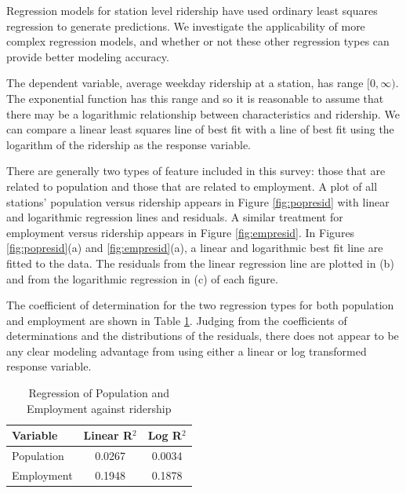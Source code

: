 \documentclass[11pt]{report}
\begin{document}
Regression models for station level ridership have used ordinary least squares regression \cite{Kuby2004, Taylor2008, Currie2011, Durning2015, Gutierrez2011} to generate predictions. We investigate the applicability of more complex regression models, and whether or not these other regression types can provide better modeling accuracy.

The dependent variable, average weekday ridership at a station, has range $[0, \infty)$. The exponential function has this range and so it is reasonable to assume that there may be a logarithmic relationship between characteristics and ridership. We can compare a linear least squares line of best fit with a line of best fit using the logarithm of the ridership as the response variable. 

There are generally two types of feature included in this survey: those that are related to population and those that are related to employment. A plot of all stations' population versus ridership appears in Figure \ref{fig:popresid} with linear and logarithmic regression lines and residuals. A similar treatment for employment versus ridership appears in Figure \ref{fig:empresid}. In Figures  \ref{fig:popresid}(a) and \ref{fig:empresid}(a), a linear and logarithmic best fit line are fitted to the data. The residuals from the linear regression line are plotted in (b) and from the logarithmic regression in (c) of each figure. 

The coefficient of determination for the two regression types for both population and employment are shown in Table \ref{tab:regr2}. Judging from the coefficients of determinations and the distributions of the residuals, there does not appear to be any clear modeling advantage from using either a linear or log transformed response variable.

\begin{table}[H]
\centering
\begin{tabular}{lcc}
\toprule Variable&Linear R$^2$&Log R$^2$ \\ 
\midrule Population&0.0267&0.0034 \\
Employment&0.1948&0.1878 \\
\bottomrule
\end{tabular}
\caption{Regression of Population and Employment against ridership}\label{tab:regr2}
\end{table}
\end{document}
